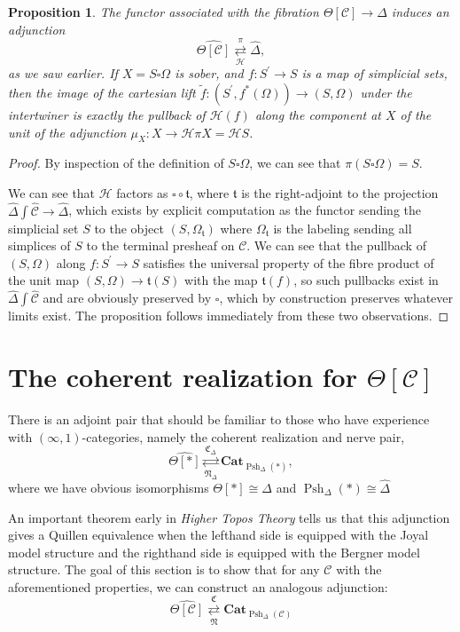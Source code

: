 \documentclass{amsart}
\numberwithin{equation}{section}
\theoremstyle{plain}   %
\newtheorem{prop}[subsection]{Proposition}
\theoremstyle{remark}
\theoremstyle{plain}
\DeclareMathOperator{\Psh}{Psh}
\newcommand{\Cat}{\ensuremath{\mathbf{Cat}}}
\newcommand{\psh}[1]{\ensuremath{\widehat{#1}}}
\newcommand{\C}{\ensuremath{\mathcal{C}}}
\newcommand{\cellset}{\ensuremath{\widehat{\Theta[\mathcal{C}]}}}
\newcommand{\ssetlab}{\ensuremath{\widehat{\Delta} \int \widehat{\mathcal{C}}}}
\newcommand{\spsh}{\ensuremath{\operatorname{Psh}_\Delta(\mathcal{C})}}
\begin{document}
\begin{prop}\label{pullbacksober}
	The functor associated with the fibration \(\Theta[\C]\to \Delta\) induces an adjunction 
	\[\cellset \underset{\mathscr{H}}{\overset{\pi}{\rightleftarrows}} \psh{\Delta} ,\]
	as we saw earlier. If \(X=S\square\Omega\) is sober, and \(f:S^\prime\to S\) is a map of simplicial sets, then the image of the cartesian lift \(\tilde{f}:(S^\prime, f^\ast(\Omega))\to (S,\Omega)\) under the intertwiner is exactly the pullback of \(\mathscr{H}(f)\) along the component at \(X\) of the unit of the adjunction \(\mu_X:X\to \mathscr{H}\pi X= \mathscr{H} S\).
\end{prop}
\begin{proof} 
	By inspection of the definition of \(S\square\Omega\), we can see that \(\pi(S\square\Omega)=S\).

	We can see that \(\mathscr{H}\) factors as \(\square\circ \mathfrak{t}\), where \(\mathfrak{t}\) is the right-adjoint to the projection \(\ssetlab\to \psh{\Delta}\), which exists by explicit computation as the functor sending the simplicial set \(S\) to the object \((S,\Omega_{\mathfrak{t}})\) where \(\Omega_{\mathfrak{t}}\) is the labeling sending all simplices of \(S\) to the terminal presheaf on \(\C\).   We can see that the pullback of \((S,\Omega)\) along \(f:S^\prime\to S\) satisfies the universal property of the fibre product of the unit map \((S,\Omega)\to \mathfrak{t}(S)\) with the map \(\mathfrak{t}(f)\), so such pullbacks exist in \(\ssetlab\) and are obviously preserved by \(\square\), which by construction preserves whatever limits exist. The proposition follows immediately from these two observations.
\end{proof}
\section{The coherent realization for \(\Theta[\C]\)}
There is an adjoint pair that should be familiar to those who have experience with \((\infty,1)\)-categories, namely the coherent realization and nerve pair, \[\psh{\Theta[\ast]}  \underset{\mathfrak{N}_\Delta}{\overset{\mathfrak{C}_\Delta}{\rightleftarrows}} \Cat_{\Psh_\Delta(\ast)},\] where we have obvious isomorphisms \(\Theta[\ast]\cong \Delta\) and \(\Psh_\Delta(\ast)\cong \psh{\Delta}\)

An important theorem early in \emph{Higher Topos Theory} tells us that this adjunction gives a Quillen equivalence when the lefthand side is equipped with the Joyal model structure and the righthand side is equipped with the Bergner model structure.  The goal of this section is to show that for any \(\C\) with the aforementioned properties, we can construct an analogous adjunction:
\[\cellset \underset{\mathfrak{N}}{\overset{\mathfrak{C}}{\rightleftarrows}} \Cat_{\spsh}\]
\end{document}
